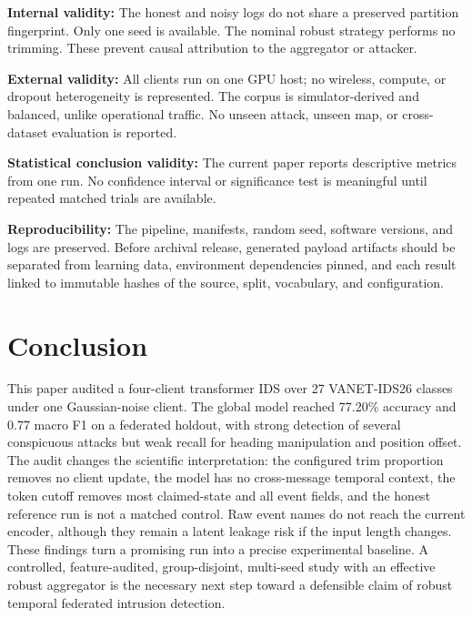 \documentclass[journal]{IEEEtran}
\begin{document}
\textbf{Internal validity:} The honest and noisy logs do not share a preserved partition fingerprint. Only one seed is available. The nominal robust strategy performs no trimming. These prevent causal attribution to the aggregator or attacker.

\textbf{External validity:} All clients run on one GPU host; no wireless, compute, or dropout heterogeneity is represented. The corpus is simulator-derived and balanced, unlike operational traffic. No unseen attack, unseen map, or cross-dataset evaluation is reported.

\textbf{Statistical conclusion validity:} The current paper reports descriptive metrics from one run. No confidence interval or significance test is meaningful until repeated matched trials are available.

\textbf{Reproducibility:} The pipeline, manifests, random seed, software versions, and logs are preserved. Before archival release, generated payload artifacts should be separated from learning data, environment dependencies pinned, and each result linked to immutable hashes of the source, split, vocabulary, and configuration.

\section{Conclusion}
This paper audited a four-client transformer IDS over 27 VANET-IDS26 classes under one Gaussian-noise client. The global model reached 77.20\% accuracy and 0.77 macro F1 on a federated holdout, with strong detection of several conspicuous attacks but weak recall for heading manipulation and position offset. The audit changes the scientific interpretation: the configured trim proportion removes no client update, the model has no cross-message temporal context, the token cutoff removes most claimed-state and all event fields, and the honest reference run is not a matched control. Raw event names do not reach the current encoder, although they remain a latent leakage risk if the input length changes. These findings turn a promising run into a precise experimental baseline. A controlled, feature-audited, group-disjoint, multi-seed study with an effective robust aggregator is the necessary next step toward a defensible claim of robust temporal federated intrusion detection.
\end{document}
